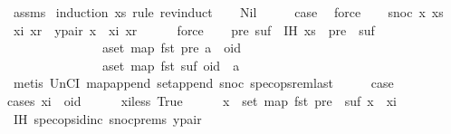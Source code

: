 \begin{isabellebody}
%
\isatagproof
{}\isamarkupfalse%
\ assms\ \isamarkupfalse%
{\isacharparenleft}induction\ xs\ rule{\isacharcolon}\ rev{\isacharunderscore}induct{\isacharparenright}\isanewline
\ \ \isamarkupfalse%
\ Nil\isanewline
\ \ \isamarkupfalse%
\ \isamarkupfalse%
\ {\isacharquery}case\ \isamarkupfalse%
\ force\isanewline
{}\isamarkupfalse%
\isanewline
\ \ \isamarkupfalse%
\ {\isacharparenleft}snoc\ x\ xs{\isacharparenright}\isanewline
\ \ \isamarkupfalse%
\ xi\ xr\ \ y{\isacharunderscore}pair{\isacharcolon}\ {\isachardoublequoteopen}x\ {\isacharequal}\ {\isacharparenleft}xi{\isacharcomma}\ xr{\isacharparenright}{\isachardoublequoteclose}\isanewline
\ \ \ \ \isamarkupfalse%
\ force\isanewline
\ \ \isamarkupfalse%
\ pre\ suf\ \ IH{\isacharcolon}\ {\isachardoublequoteopen}xs\ {\isacharequal}\ pre\ {\isacharat}\ suf\ {\isasymand}\isanewline
\ \ \ \ \ \ \ \ \ \ \ \ \ \ \ {\isacharparenleft}{\isasymforall}a{\isasymin}set\ {\isacharparenleft}map\ fst\ pre{\isacharparenright}{\isachardot}\ a\ {\isacharless}\ oid{\isacharparenright}\ {\isasymand}\isanewline
\ \ \ \ \ \ \ \ \ \ \ \ \ \ \ {\isacharparenleft}{\isasymforall}a{\isasymin}set\ {\isacharparenleft}map\ fst\ suf{\isacharparenright}{\isachardot}\ oid\ {\isacharless}\ a{\isacharparenright}{\isachardoublequoteclose}\isanewline
\ \ \ \ \isamarkupfalse%
\ {\isacharparenleft}metis\ UnCI\ map{\isacharunderscore}append\ set{\isacharunderscore}append\ snoc\ spec{\isacharunderscore}ops{\isacharunderscore}rem{\isacharunderscore}last{\isacharparenright}\isanewline
\ \ \isamarkupfalse%
\ \isamarkupfalse%
\ {\isacharquery}case\isanewline
\ \ \isamarkupfalse%
{\isacharparenleft}cases\ {\isachardoublequoteopen}xi\ {\isacharless}\ oid{\isachardoublequoteclose}{\isacharparenright}\isanewline
\ \ \ \ \isamarkupfalse%
\ xi{\isacharunderscore}less{\isacharcolon}\ True\isanewline
\ \ \ \ \isamarkupfalse%
\ {\isachardoublequoteopen}{\isasymforall}x\ {\isasymin}\ set\ {\isacharparenleft}map\ fst\ {\isacharparenleft}pre\ {\isacharat}\ suf{\isacharparenright}{\isacharparenright}{\isachardot}\ x\ {\isacharless}\ xi{\isachardoublequoteclose}\isanewline
\ \ \ \ \ \ \isamarkupfalse%
\ IH\ spec{\isacharunderscore}ops{\isacharunderscore}id{\isacharunderscore}inc\ snoc{\isachardot}prems{\isacharparenleft}{}{\isacharparenright}\ y{\isacharunderscore}pair\ \isamarkupfalse%

\end{isabellebody}
